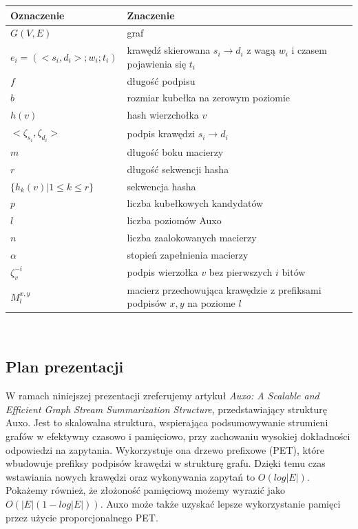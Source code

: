 \documentclass{article}
\theoremstyle{definition}
\begin{document}
    \begin{tabular}{|l | l | } 
        \hline
        Oznaczenie & Znaczenie \\
        \hline\hline
        $G(V,E)$ & graf \\ 
        \hline
        $e_i = (<s_i,d_i>; w_i; t_i)$ & krawędź skierowana $s_i \rightarrow d_i$ z wagą $w_i$ i czasem pojawienia się $t_i$  \\ 
        \hline
        $f$ & długość podpisu \\ 
        \hline
        $b$ & rozmiar kubełka na zerowym poziomie \\ 
        \hline
        $h(v)$ & hash wierzchołka $v$ \\ 
        \hline
        $<\zeta_{s_i},\zeta_{d_i}>$ & podpis krawędzi $s_i \rightarrow d_i$ \\ 
        \hline
        $m$ & długość boku macierzy \\ 
        \hline
        $r$ & długość sekwencji hasha \\ 
        \hline
        $\{h_k(v)| 1 \leq k \leq r\}$ & sekwencja hasha \\ 
        \hline
        $p$ & liczba kubełkowych kandydatów \\ 
        \hline
        $l$ & liczba poziomów Auxo \\ 
        \hline
        $n$ & liczba zaalokowanych macierzy \\ 
        \hline
        $\alpha$ & stopień zapełnienia macierzy \\ 
        \hline
        $\zeta_{v}^{-i}$ & podpis wierzołka $v$ bez pierwszych $i$ bitów \\ 
        \hline
        $M_{l}^{x,y}$ & macierz przechowująca krawędzie z prefiksami podpisów $x, y$ na poziome $l$  \\ 
        \hline
    \end{tabular}\\
    
    \subsection{Plan prezentacji}
        W ramach niniejszej prezentacji zreferujemy artykuł \textit{Auxo: A Scalable and Efficient Graph Stream Summarization Structure}, przedstawiający strukturę Auxo. Jest to skalowalna struktura, wspierająca podsumowywanie strumieni grafów w efektywny czasowo i pamięciowo, przy zachowaniu wysokiej dokładności odpowiedzi na zapytania. Wykorzystuje ona drzewo prefixowe (PET), które wbudowuje prefiksy podpisów krawędzi w strukturę grafu. Dzięki temu czas wstawiania nowych krawędzi oraz wykonywania zapytań to $O(log|E|)$. Pokażemy również, że złożoność pamięciową możemy wyrazić jako $O(|E|(1 - log|E|))$. Auxo może także uzyskać lepsze wykorzystanie pamięci przez użycie proporcjonalnego PET.
    
\end{document}
